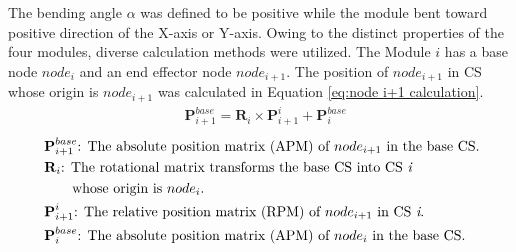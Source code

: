 \noindent The bending angle $\alpha$ was defined to be positive while the module bent toward positive 
direction of the X-axis or Y-axis. Owing to the distinct properties of the four modules, diverse calculation 
methods were utilized. The Module $i$ has a base node $node_i$ and an end effector node $node_{i+1}$. 
The position of $node_{i+1}$ in CS whose origin is $node_{i+1}$ was calculated in Equation 
\ref{eq:node i+1 calculation}.
\begin{align}
    &\textbf{P}_{i+1}^{base} = \textbf{R}_{i} \times \textbf{P}_{i+1}^{i} + \textbf{P}_{i}^{base}
    \label{eq:node i+1 calculation}
\end{align}
\begin{align*}
    &\ \textbf{P}_{i+1}^{base}\text{: The absolute position matrix (APM) of $node_{i+1}$ in the base CS.}\\
    &\ \textbf{R}_{i}\text{: The rotational matrix transforms the base CS into CS \textit{i} }\\
    &\ \qquad\text{whose origin is $node_i$.}\\
    &\ \textbf{P}_{i+1}^{i}\text{: The relative position matrix (RPM) of $node_{i+1}$ in CS \textit{i}.}\\
    &\ \textbf{P}_{i}^{base}\text{: The absolute position matrix (APM) of $node_{i}$ in the base CS.}
\end{align*}
